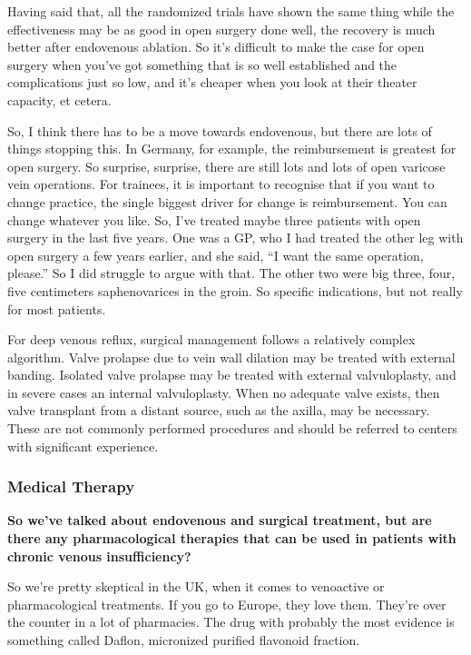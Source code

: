 \documentclass[
]{book}
\begin{document}
Having said that, all the randomized trials have shown the same thing
while the effectiveness may be as good in open surgery done well, the
recovery is much better after endovenous ablation. So it's difficult to
make the case for open surgery when you've got something that is so well
established and the complications just so low, and it's cheaper when you
look at their theater capacity, et cetera.

So, I think there has to be a move towards endovenous, but there are
lots of things stopping this. In Germany, for example, the reimbursement
is greatest for open surgery. So surprise, surprise, there are still
lots and lots of open varicose vein operations. For trainees, it is
important to recognise that if you want to change practice, the single
biggest driver for change is reimbursement. You can change whatever you
like. So, I've treated maybe three patients with open surgery in the
last five years. One was a GP, who I had treated the other leg with open
surgery a few years earlier, and she said, ``I want the same operation,
please.'' So I did struggle to argue with that. The other two were big
three, four, five centimeters saphenovarices in the groin. So specific
indications, but not really for most patients.

For deep venous reflux, surgical management follows a relatively complex
algorithm.\citep{odonnell2014} Valve prolapse due to vein wall dilation may
be treated with external banding. Isolated valve prolapse may be treated
with external valvuloplasty, and in severe cases an internal
valvuloplasty. When no adequate valve exists, then valve transplant from
a distant source, such as the axilla, may be necessary.\citep{kabbani2011}
These are not commonly performed procedures and should be referred to
centers with significant experience.

\hypertarget{medical-therapy}{%
\subsubsection{Medical Therapy}\label{medical-therapy}}

\textbf{So we've talked about endovenous and surgical treatment, but are there
any pharmacological therapies that can be used in patients with chronic
venous insufficiency?}

So we're pretty skeptical in the UK, when it comes to venoactive or
pharmacological treatments. If you go to Europe, they love them. They're
over the counter in a lot of pharmacies. The drug with probably the most
evidence is something called Daflon, micronized purified flavonoid
fraction.
\end{document}
